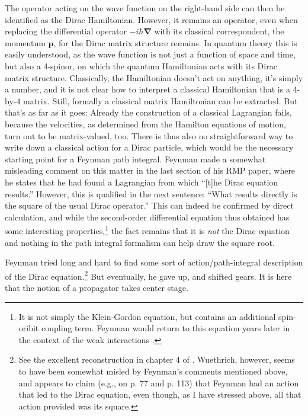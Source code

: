 \documentclass[12pt,a4paper]{article}
\begin{document}
The operator acting on the wave function on the right-hand side can then be identified as the Dirac Hamiltonian. However, it remains an operator, even when replacing the differential operator $-i\hbar \mathbf{\nabla}$ with its classical correspondent, the momentum $\mathbf{p}$, for the Dirac matrix structure remains. In quantum theory this is easily understood, as the wave function is not just a function of space and time, but also a 4-spinor, on which the quantum Hamiltonian acts with its Dirac matrix structure. Classically, the Hamiltonian doesn't act on anything, it's simply a number, and it is not clear how to interpret a classical Hamiltonian that is a 4-by-4 matrix. Still, formally a classical matrix Hamiltonian can be extracted. But that's as far as it goes: Already the construction of a classical Lagrangian fails, because the velocities, as determined from the Hamilton equations of motion, turn out to be matrix-valued, too. There is thus also no straightforward way to write down a classical action for a Dirac particle, which would be the necessary starting point for a Feynman path integral. Feynman made a somewhat misleading comment on this matter in the last section of his RMP paper, where he states that he had found a Lagrangian from which ``[t]he Dirac equation results.'' However, this is qualified in the next sentence: ``What results directly is the square of the usual Dirac operator.'' This can indeed be confirmed by direct calculation, and while the second-order differential equation thus obtained has some interesting properties,\footnote{It is not simply the Klein-Gordon equation, but contains an additional spin-oribit coupling term. Feynman would return to this equation years later in the context of the weak interactions \citep{feynman_1958_theory}.} the fact remains that it is \emph{not} the Dirac equation and nothing in the path integral formalism can help draw the square root.

Feynman tried long and hard to find some sort of action/path-integral description of the Dirac equation.\footnote{\label{fn:misled} See the excellent reconstruction in chapter 4 of \citep{wuethrich_2010_the-genesis}. Wuethrich, however, seems to have been somewhat misled by Feynman's comments mentioned above, and appears to claim (e.g., on p. 77 and p. 113) that Feynman had an action that led to the Dirac equation, even though, as I have stressed above, all that action provided was its square.} But eventually, he gave up, and shifted gears. It is here that the notion of a propagator takes center stage.
\end{document}
